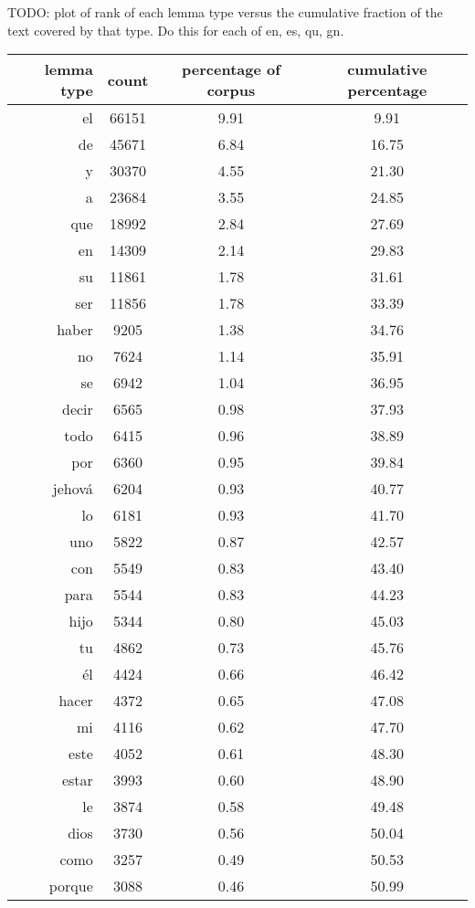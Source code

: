\begin{figure*}
TODO: plot of rank of each lemma type versus the cumulative fraction of the text
covered by that type. Do this for each of en, es, qu, gn.


  \begin{tiny}
  \begin{centering}
  \begin{tabular}{|r|c|c|c|}
    \hline
    lemma type & count & percentage of corpus & cumulative percentage \\
    \hline
el & 66151 & 9.91 & 9.91 \\
de & 45671 & 6.84 & 16.75 \\
y & 30370 & 4.55 & 21.30 \\
a & 23684 & 3.55 & 24.85 \\
que & 18992 & 2.84 & 27.69 \\
en & 14309 & 2.14 & 29.83 \\
su & 11861 & 1.78 & 31.61 \\
ser & 11856 & 1.78 & 33.39 \\
haber & 9205 & 1.38 & 34.76 \\
no & 7624 & 1.14 & 35.91 \\
se & 6942 & 1.04 & 36.95 \\
decir & 6565 & 0.98 & 37.93 \\
todo & 6415 & 0.96 & 38.89 \\
por & 6360 & 0.95 & 39.84 \\
jehová & 6204 & 0.93 & 40.77 \\
lo & 6181 & 0.93 & 41.70 \\
uno & 5822 & 0.87 & 42.57 \\
con & 5549 & 0.83 & 43.40 \\
para & 5544 & 0.83 & 44.23 \\
hijo & 5344 & 0.80 & 45.03 \\
tu & 4862 & 0.73 & 45.76 \\
él & 4424 & 0.66 & 46.42 \\
hacer & 4372 & 0.65 & 47.08 \\
mi & 4116 & 0.62 & 47.70 \\
este & 4052 & 0.61 & 48.30 \\
estar & 3993 & 0.60 & 48.90 \\
le & 3874 & 0.58 & 49.48 \\
dios & 3730 & 0.56 & 50.04 \\
como & 3257 & 0.49 & 50.53 \\
porque & 3088 & 0.46 & 50.99 \\

\end{tabular}
\end{centering}
\end{tiny}
\end{figure*}
